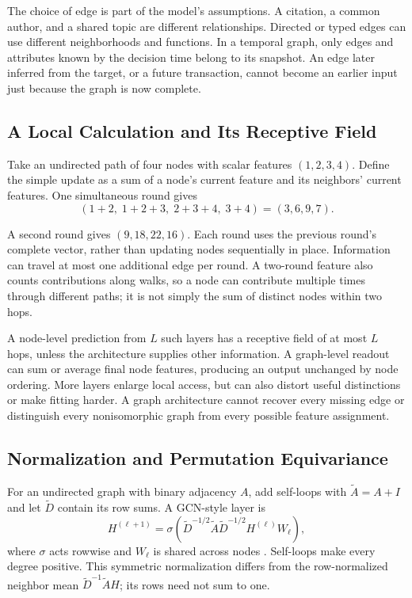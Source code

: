 The choice of edge is part of the model's assumptions. A citation, a common author, and a shared topic are different relationships. Directed or typed edges can use different neighborhoods and functions. In a temporal graph, only edges and attributes known by the decision time belong to its snapshot. An edge later inferred from the target, or a future transaction, cannot become an earlier input just because the graph is now complete.

\par\noindent\begin{minipage}{\linewidth}
\subsection{A Local Calculation and Its Receptive Field}

Take an undirected path of four nodes with scalar features $(1,2,3,4)$. Define the simple update as a sum of a node's current feature and its neighbors' current features. One simultaneous round gives
\[
 (1+2,\;1+2+3,\;2+3+4,\;3+4)=(3,6,9,7).
\]
\end{minipage}\par\addvspace{\belowdisplayskip}
A second round gives $(9,18,22,16)$. Each round uses the previous round's complete vector, rather than updating nodes sequentially in place. Information can travel at most one additional edge per round. A two-round feature also counts contributions along walks, so a node can contribute multiple times through different paths; it is not simply the sum of distinct nodes within two hops.

A node-level prediction from $L$ such layers has a receptive field of at most $L$ hops, unless the architecture supplies other information. A graph-level readout can sum or average final node features, producing an output unchanged by node ordering. More layers enlarge local access, but can also distort useful distinctions or make fitting harder. A graph architecture cannot recover every missing edge or distinguish every nonisomorphic graph from every possible feature assignment.

\subsection{Normalization and Permutation Equivariance}

For an undirected graph with binary adjacency $A$, add self-loops with $\widetilde A=A+I$ and let $\widetilde D$ contain its row sums. A GCN-style layer is
\[
 H^{(\ell+1)}=\sigma\!\left(
 \widetilde D^{-1/2}\widetilde A\widetilde D^{-1/2}
 H^{(\ell)}W_\ell\right),
\]
where $\sigma$ acts rowwise and $W_\ell$ is shared across nodes \citep{kipf2017gcn}. Self-loops make every degree positive. This symmetric normalization differs from the row-normalized neighbor mean $\widetilde D^{-1}\widetilde A H$; its rows need not sum to one.


